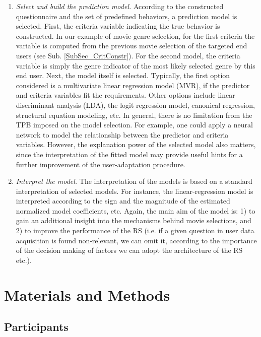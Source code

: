 \documentclass{llncs}
\begin{document}
\begin{enumerate}
 \item {\it Select and build the prediction model.} According to the constructed questionnaire and the set of predefined behaviors, a prediction model is selected. First, the criteria variable indicating the true behavior is constructed. In our example of movie-genre selection, for the first criteria the variable is computed from the previous movie selection of the targeted end users (see Sub. \ref{SubSec_CritConstr}). For the second model, the criteria variable is simply the genre indicator of the most likely selected genre by this end user. Next, the model itself is selected. Typically, the first option considered is a multivariate linear regression model (MVR), if the predictor and criteria variables fit the requirements. Other options include linear discriminant analysis (LDA), the logit regression model, canonical regression, structural equation modeling, etc. In general, there is no limitation from the TPB imposed on the model selection. For example, one could apply a neural network to model the relationship between the predictor and criteria variables. However, the explanation power of the selected model also matters, since the interpretation of the fitted model may provide useful hints for a further improvement of the user-adaptation procedure. 
 \item {\it Interpret the model.} The interpretation of the models is based on a standard interpretation of selected models. For instance, the linear-regression model is interpreted according to the sign and the magnitude of the estimated normalized model coefficients, etc. Again, the main aim of the model is: 1) to gain an additional insight into the mechanisms behind movie selections, and 2) to improve the performance of the RS (i.e. if a given question in user data acquisition is found non-relevant, we can omit it, according to the importance of the decision making of factors we can adopt the architecture of the RS etc.). 
\end{enumerate}


\section{Materials and Methods}\label{Sec_MatAndMeths}  
  
\subsection{Participants}\label{SubSec_Participants}
\end{document}
